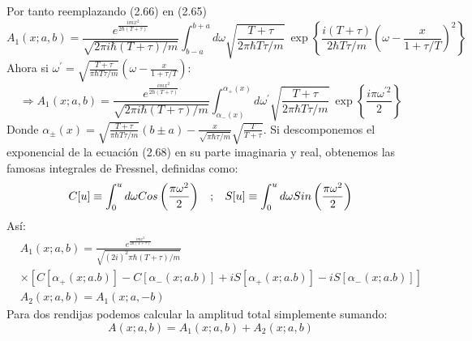Por tanto reemplazando (2.66) en (2.65)
\begin{equation}
A_{1}(x;a,b)=\frac{e^{\frac{imx^{2}}{2\hbar(T+\tau)}}}{\sqrt{2\pi i\hbar(T+\tau)/m}}\int_{b-a}^{b+a}d\omega\sqrt{\frac{T+\tau}{2\pi\hbar T\tau/m}}\ \exp\left\{ \frac{i(T+\tau)}{2\hbar T\tau/m}\left(\omega-\frac{x}{1+\tau/T}\right)^{2}\right\}
\end{equation}
Ahora si $\omega^{\prime}=\sqrt{\frac{T+\tau}{\pi\hbar T\tau/m}}\left(\omega-\frac{x}{1+\tau/T}\right)$:
\begin{equation}
\Rightarrow A_{1}(x;a,b)=\frac{e^{\frac{imx^{2}}{2\hbar(T+\tau)}}}{\sqrt{2\pi i\hbar(T+\tau)/m}}\int_{\alpha_{-}(x)}^{\alpha_{+}(x)}d\omega^{\prime}\sqrt{\frac{T+\tau}{2\pi\hbar T\tau/m}}\ \exp\left\{ \frac{i\pi\omega^{\prime 2}}{2}\right\} 
\end{equation}
Donde $\alpha_{\pm}(x)=\sqrt{\frac{T+\tau}{\pi\hbar T\tau/m}}(b\pm a)-\frac{x}{\sqrt{\pi\hbar\tau/m}}\sqrt{\frac{T}{T+\tau}}$.
Si descomponemos el exponencial de la ecuación (2.68) en su parte imaginaria y real, obtenemos las famosas integrales de Fressnel, definidas como:
\begin{equation}
C[u]\equiv \int_{0}^{u}d\omega Cos\left(\frac{\pi\omega ^2 }{2}\right)\hspace{0.3cm} ;\hspace{0.3cm} S[u]\equiv \int_{0}^{u}d\omega Sin\left(\frac{\pi\omega ^2 }{2}\right)
\end{equation}
Así:
\begin{eqnarray}
&\nonumber A_{1}(x;a,b)=\frac{e^{\frac{imx^{2}}{2\hbar(T+\tau)}}}{\sqrt{(2i)^{2}\pi\hbar(T+\tau)/m}}\\
&\times[C[\alpha_{+}(x;a.b)]-C[\alpha_{-}(x;a.b)]+iS[\alpha_{+}(x;a.b)]-iS[\alpha_{-}(x;a.b)]]\\
&A_{2}(x;a,b)=A_{1}(x;a,-b)
\end{eqnarray}
Para dos rendijas podemos calcular la amplitud total simplemente sumando:
\begin{equation}
A(x;a,b)=A_{1}(x;a,b)+A_{2}(x;a,b)
\end{equation}


